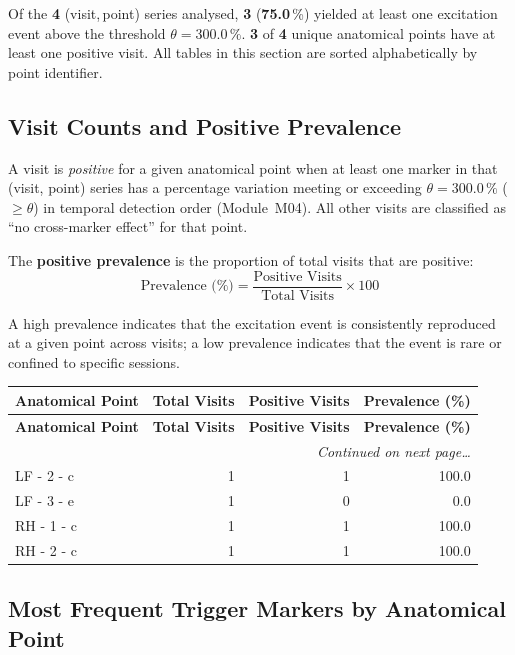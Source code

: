 \documentclass[a4paper,11pt]{article}
\begin{document}
\noindent
Of the \textbf{4} (visit,\,point) series analysed,
\textbf{3} (\textbf{75.0}\,\%) yielded at least one
excitation event above the threshold $\theta = 300.0\,\%$.
\textbf{3} of \textbf{4} unique anatomical points
have at least one positive visit.
All tables in this section are sorted alphabetically by point identifier.

\subsection{Visit Counts and Positive Prevalence}

A visit is \emph{positive} for a given anatomical point when at least one marker in that
(visit, point) series has a percentage variation meeting or exceeding
$\theta = 300.0\,\%$ ($\geq \theta$) in temporal detection order (Module~M04).
All other visits are classified as ``no cross-marker effect'' for that point.

The \textbf{positive prevalence} is the proportion of total visits that are positive:
\[
  \text{Prevalence (\%)} = \frac{\text{Positive Visits}}{\text{Total Visits}} \times 100
\]

A high prevalence indicates that the excitation event is consistently reproduced at a given
point across visits; a low prevalence indicates that the event is rare or confined to
specific sessions.

\begin{small}
\begin{longtable}{p{5cm}rrr}
\toprule
\textbf{Anatomical Point} &
\textbf{Total Visits} &
\textbf{Positive Visits} &
\textbf{Prevalence (\%)} \\
\midrule
\endfirsthead
\toprule
\textbf{Anatomical Point} &
\textbf{Total Visits} &
\textbf{Positive Visits} &
\textbf{Prevalence (\%)} \\
\midrule
\endhead
\midrule
\multicolumn{4}{r}{\small\emph{Continued on next page\ldots}} \\
\endfoot
\bottomrule
\endlastfoot
LF - 2 - c & 1 & 1 & 100.0 \\
LF - 3 - e & 1 & 0 & 0.0 \\
RH - 1 - c & 1 & 1 & 100.0 \\
RH - 2 - c & 1 & 1 & 100.0 \\
\end{longtable}
\end{small}

\subsection{Most Frequent Trigger Markers by Anatomical Point}
\end{document}
